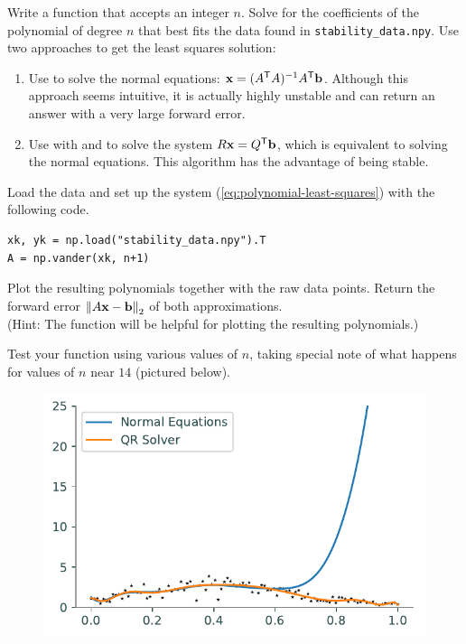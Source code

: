\begin{problem}
Write a function that accepts an integer $n$.
Solve for the coefficients of the polynomial of degree $n$ that best fits the data found in \texttt{stability\_data.npy}.
Use two approaches to get the least squares solution:

\begin{enumerate}
\item Use  to solve the normal equations: $\mathbf{x} = (A^{\mathsf T} A)^{-1}A^{\mathsf T} \mathbf{b}$.
Although this approach seems intuitive, it is actually highly unstable and can return an answer with a very large forward error.

\item Use  with  and  to solve the system $R\mathbf{x} = Q^{\mathsf T}\mathbf{b}$, which is equivalent to solving the normal equations.
This algorithm has the advantage of being stable.
\end{enumerate}

Load the data and set up the system (\ref{eq:polynomial-least-squares}) with the following code.

\begin{lstlisting}
xk, yk = np.load("stability_data.npy").T
A = np.vander(xk, n+1)
\end{lstlisting}

Plot the resulting polynomials together with the raw data points.
Return the forward error $\left\lVert A\mathbf{x}-\mathbf{b}\right\rVert_2$ of both approximations.
\\(Hint: The function  will be helpful for plotting the resulting polynomials.)

Test your function using various values of $n$, taking special note of what happens for values of $n$ near $14$ (pictured below).

\begin{figure}[H]
    \centering
    \includegraphics[width=.7\textwidth]{figures/lstsq_stability.pdf}
\end{figure}
\end{problem}

